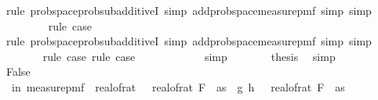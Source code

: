\begin{isabellebody}
\ {\isacharparenleft}{\kern0pt}rule\ prob{\isacharunderscore}{\kern0pt}space{\isachardot}{\kern0pt}prob{\isacharunderscore}{\kern0pt}sub{\isacharunderscore}{\kern0pt}additiveI{\isacharcomma}{\kern0pt}\ simp\ add{\isacharcolon}{\kern0pt}prob{\isacharunderscore}{\kern0pt}space{\isacharunderscore}{\kern0pt}measure{\isacharunderscore}{\kern0pt}pmf{\isacharcomma}{\kern0pt}\ simp{\isacharcomma}{\kern0pt}\ simp{\isacharparenright}{\kern0pt}\isanewline
\ \ \ \ \ \ \ \isamarkupfalse%
\ {\isacharparenleft}{\kern0pt}rule\ case{\isacharunderscore}{\kern0pt}{}{\isacharparenright}{\kern0pt}\isanewline
\ \ \ \ \ \ \isamarkupfalse%
\ {\isacharparenleft}{\kern0pt}rule\ prob{\isacharunderscore}{\kern0pt}space{\isachardot}{\kern0pt}prob{\isacharunderscore}{\kern0pt}sub{\isacharunderscore}{\kern0pt}additiveI{\isacharcomma}{\kern0pt}\ simp\ add{\isacharcolon}{\kern0pt}prob{\isacharunderscore}{\kern0pt}space{\isacharunderscore}{\kern0pt}measure{\isacharunderscore}{\kern0pt}pmf{\isacharcomma}{\kern0pt}\ simp{\isacharcomma}{\kern0pt}\ simp{\isacharparenright}{\kern0pt}\isanewline
\ \ \ \ \ \ \isamarkupfalse%
\ {\isacharparenleft}{\kern0pt}rule\ case{\isacharunderscore}{\kern0pt}{}{\isacharcomma}{\kern0pt}\ rule\ case{\isacharunderscore}{\kern0pt}{}{\isacharparenright}{\kern0pt}\isanewline
\ \ \ \ \isamarkupfalse%
\ \isamarkupfalse%
\ {\isachardoublequoteopen}{\isachardot}{\kern0pt}{\isachardot}{\kern0pt}{\isachardot}{\kern0pt}\ {\isacharequal}{\kern0pt}\ {}{\isacharslash}{\kern0pt}{}{\isachardoublequoteclose}\ \isamarkupfalse%
\ simp\isanewline
\ \ \ \ \isamarkupfalse%
\ \isamarkupfalse%
\ {\isacharquery}{\kern0pt}thesis\ \isamarkupfalse%
\ simp\isanewline
\ \ \isamarkupfalse%
\isanewline
\ \ \ \ \isamarkupfalse%
\ False\isanewline
\ \ \ \ \isamarkupfalse%
\ {\isachardoublequoteopen}{\isasymP}{\isacharparenleft}{\kern0pt}{\isasymomega}\ in\ measure{\isacharunderscore}{\kern0pt}pmf\ {\isasymOmega}\ real{\isacharunderscore}{\kern0pt}of{\isacharunderscore}{\kern0pt}rat\ {\isasymdelta}\ {\isacharasterisk}{\kern0pt}\ real{\isacharunderscore}{\kern0pt}of{\isacharunderscore}{\kern0pt}rat\ {\isacharparenleft}{\kern0pt}F\ {}\ as{\isacharparenright}{\kern0pt}\ {\isacharless}{\kern0pt}\ {\isasymbar}g{\isacharprime}{\kern0pt}\ {\isacharparenleft}{\kern0pt}h\ {\isasymomega}{\isacharparenright}{\kern0pt}\ {\isacharminus}{\kern0pt}\ real{\isacharunderscore}{\kern0pt}of{\isacharunderscore}{\kern0pt}rat\ {\isacharparenleft}{\kern0pt}F\ {}\ as{\isacharparenright}{\kern0pt}{\isasymbar}{\isacharparenright}{\kern0pt}\ {\isasymle}\isanewline

\end{isabellebody}
